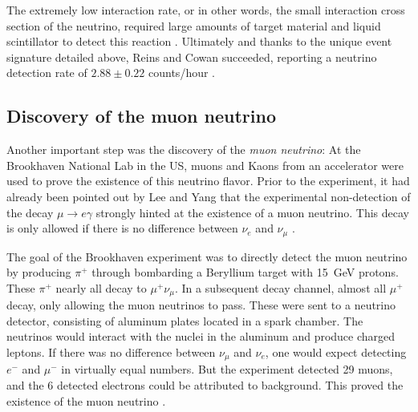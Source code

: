 \documentclass[
    a4paper, %
    fontsize=10pt, %
    twoside=false, %
    numbers=noenddot, %
    fontmethod=tex,
]{kaobook}
\begin{document}
The extremely low interaction rate, or in other words, the small interaction cross section of the neutrino, required large amounts of target material and liquid scintillator to detect this reaction \cite{Giunti2007}. Ultimately and thanks to the unique event signature detailed above, Reins and Cowan succeeded, reporting a neutrino detection rate of $2.88 \pm 0.22$ counts/hour \cite{Reines1956}.

\subsection{Discovery of the muon neutrino}
Another important step was the discovery of the \textit{muon neutrino}: At the Brookhaven National Lab in the US, muons and Kaons from an accelerator were used to prove the existence of this neutrino flavor. Prior to the experiment, it had already been pointed out by Lee and Yang that the experimental non-detection of the decay $\mu \rightarrow e \gamma$ strongly hinted at the existence of a muon neutrino. This decay is only allowed if there is no difference between $\nu_e$ and $\nu_\mu$ .

The goal of the Brookhaven experiment was to directly detect the muon neutrino by producing $\pi^+$ through bombarding a Beryllium target with \SI{15}{\giga\eV} protons. These $\pi^+$ nearly all decay to $\mu^+ \nu_\mu$. In a subsequent decay channel, almost all $\mu^+$ decay, only allowing the muon neutrinos to pass. These were sent to a neutrino detector, consisting of aluminum plates located in a spark chamber. The neutrinos would interact with the nuclei in the aluminum and produce charged leptons. If there was no difference between $\nu_\mu$ and $\nu_e$, one would expect detecting $e^-$ and $\mu^-$ in virtually equal numbers. But the experiment detected 29 muons, and the 6 detected electrons could be attributed to background. This proved the existence of the muon neutrino .
\end{document}
